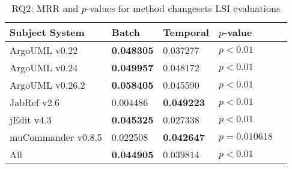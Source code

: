 
\begin{table}[t]
\renewcommand{\arraystretch}{1.3}
\footnotesize
\centering
\caption{RQ2: MRR and $p$-values for method changesets LSI evaluations}
\begin{tabular}{l|ll|ll}
   \toprule
    Subject System & Batch & Temporal & $p$-value  \\
    \midrule

ArgoUML v0.22 & {\bf 0.048305 } & 0.037277 & $p < 0.01$ \\
ArgoUML v0.24 & {\bf 0.049957 } & 0.048172 & $p < 0.01$ \\
ArgoUML v0.26.2 & {\bf 0.058405 } & 0.045590 & $p < 0.01$ \\
JabRef v2.6 & 0.004486 & {\bf 0.049223 } & $p < 0.01$ \\
jEdit v4.3 & {\bf 0.045325 } & 0.027338 & $p < 0.01$ \\
muCommander v0.8.5 & 0.022508 & {\bf 0.042647 } & $p = 0.010618$ \\
\midrule
All & {\bf 0.044905 } & 0.039814 & $p < 0.01$ \\

    \bottomrule
\end{tabular}
\label{table:rq2:method:lsi}
\end{table}

